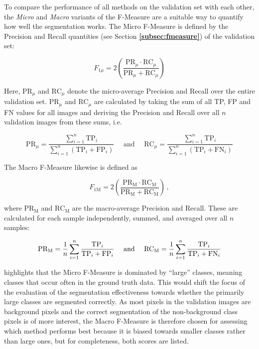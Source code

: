 \noindent To compare the performance of all methods on the validation set with each other, the \textit{Micro} and \textit{Macro} variants of the F-Measure \cite{micromacro} are a suitable way to quantify how well the segmentation works. The Micro F-Measure is defined by the Precision and Recall quantities (see Section \textbf{\ref{subsec:fmeasure}}) of the validation set:

\[ F_{1\mu} = 2 \left ( \frac{\text{PR}_\mu \cdot \text{RC}_\mu}{\text{PR}_\mu + \text{RC}_\mu} \right ) \]

\noindent Here, $\text{PR}_\mu$ and $\text{RC}_\mu$ denote the micro-average Precision and Recall over the entire validation set. $\text{PR}_\mu$ and $\text{RC}_\mu$ are calculated by taking the sum of all TP, FP and FN values for all images and deriving the Precision and Recall over all $n$ validation images from these sums, i.e.

\[ \text{PR}_\mu = \frac{\sum_{i=1}^{n}\text{TP}_i}{\sum_{i=1}^{n} (\text{TP}_i + \text{FP}_i)} \quad \text{ and } \quad \text{RC}_\mu = \frac{\sum_{i=1}^{n} \text{TP}_i}{\sum_{i=1}^{n} (\text{TP}_i + \text{FN}_i)} \]

\noindent The Macro F-Measure likewise is defined as

\[ F_{\text{1M}} = 2 \left ( \frac{\text{PR}_\text{M} \cdot \text{RC}_\text{M}}{\text{PR}_\text{M} + \text{RC}_\text{M}} \right ) \,,\]

\noindent where $\text{PR}_\text{M}$ and $\text{RC}_\text{M}$ are the macro-average Precision and Recall. These are calculated for each sample independently, summed, and averaged over all $n$ samples:

\[ \text{PR}_\text{M} = \frac{1}{n} \sum_{i=1}^{n} \frac{\text{TP}_i}{\text{TP}_i + \text{FP}_i} \text \quad \text{ and } \quad \text{RC}_\text{M} = \frac{1}{n} \sum_{i=1}^{n} \frac{\text{TP}_i}{\text{TP}_i + \text{FN}_i} \] 

\noindent \cite[pp. 317-318]{information_retrieval} highlights that the Micro F-Measure is dominated by ``large'' classes, meaning classes that occur often in the ground truth data. This would shift the focus of the evaluation of the segmentation effectiveness towards whether the primarily large classes are segmented correctly. As most pixels in the validation images are background pixels and the correct segmentation of the non-background class pixels is of more interest, the Macro F-Measure is therefore chosen for assessing which method performs best because it is biased towards smaller classes rather than large ones, but for completeness, both scores are listed.\\


